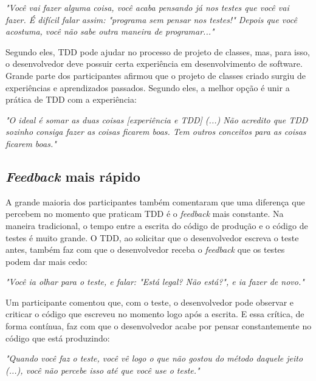 \documentclass[conference]{IEEEtran}
\begin{document}
\begin{framed}
\textit{"Você vai fazer alguma coisa, você acaba pensando já nos testes que você vai fazer. É difícil 
falar assim: "programa sem pensar nos testes!" Depois que você acostuma, você não sabe outra
maneira de programar..."}
\end{framed}

Segundo eles, TDD pode ajudar no processo de projeto de classes, mas, para isso,
o desenvolvedor deve possuir certa experiência em desenvolvimento de software. 
Grande parte dos participantes afirmou que o 
projeto de classes criado surgiu de experiências e aprendizados passados.
Segundo eles, a melhor opção é unir a prática de TDD com a experiência:

\begin{framed}
\textit{"O ideal é somar as duas coisas [experiência e TDD] (...) 
Não acredito que TDD sozinho consiga fazer as coisas ficarem boas. Tem outros conceitos
para as coisas ficarem boas."}
\end{framed}

\subsection{\textit{Feedback} mais rápido}

A grande maioria dos participantes também comentaram que uma diferença que percebem
no momento que praticam TDD é o \textit{feedback} mais constante. Na maneira
tradicional, o tempo entre a escrita do código de produção e o código
de testes é muito grande. O TDD, ao solicitar que o desenvolvedor
escreva o teste antes, também faz com que o desenvolvedor receba o \textit{feedback} que
os testes podem dar mais cedo:

\begin{framed}
\textit{"Você ia olhar para o teste, e falar: "Está legal? Não está?", e ia fazer de novo."}
\end{framed}

Um participante comentou que, com o teste, o desenvolvedor pode observar
e criticar o código que escreveu no momento logo após a escrita.
E essa crítica, de forma contínua, faz com que o desenvolvedor acabe
por pensar constantemente no código que está produzindo:

\begin{framed}
\textit{"Quando você faz o teste, você vê logo o que não gostou do método daquele jeito (...), você
não percebe isso até que você use o teste."}
\end{framed}
\end{document}
